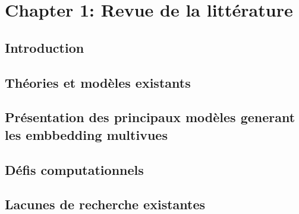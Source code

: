\setcounter{secnumdepth}{2}

\chapter{Chapter 1: Revue de la littérature}

\section{Introduction}
\section{Théories et modèles existants}  
\section{Présentation des principaux modèles generant les embbedding multivues }
\section{Défis computationnels} 
\section{Lacunes de recherche existantes}  

